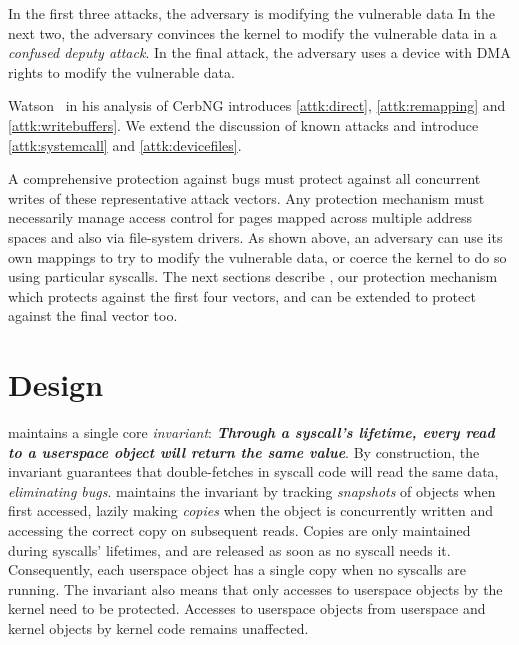 \documentclass[letterpaper,twocolumn,10pt, anonymous]{article}
\begin{document}
In the first three attacks, the adversary is modifying the vulnerable data 
In the next two, the adversary convinces the kernel to modify the vulnerable
data in a \emph{confused deputy attack}.
In the final attack, the adversary uses a device with DMA rights to modify 
the vulnerable data.

Watson~\cite{watson2007exploiting} in his analysis of CerbNG introduces
\autoref{attk:direct}, \autoref{attk:remapping} and \autoref{attk:writebuffers}.
We extend the discussion of known attacks and introduce
\autoref{attk:systemcall} and \autoref{attk:devicefiles}.

A comprehensive protection against \tocttou bugs must protect against 
all concurrent writes of these representative attack vectors.
Any protection mechanism must necessarily manage access control for pages
mapped across multiple address spaces and also via file-system drivers.
As shown above, an adversary can use its own mappings to try to modify the
vulnerable data, or coerce the kernel to do so using particular syscalls.
The next sections describe \tiktok, our protection mechanism which 
protects against the first four vectors, and can be extended to protect 
against the final vector too.


\section{\tiktok Design} 
\label{sec:design}

\tiktok maintains a single core \emph{invariant}:
\textbf{\emph{Through a syscall's lifetime, every read to a userspace object 
will return the same value}}.
By construction, the invariant guarantees that double-fetches in syscall
code will read the same data, \emph{eliminating \tocttou bugs}.
\tiktok maintains the invariant by tracking \emph{snapshots} of objects
when first accessed, lazily making \emph{copies} when the object is concurrently 
written and accessing the correct copy on subsequent reads.
Copies are only maintained during syscalls' lifetimes, and are released as 
soon as no syscall needs it.
Consequently, each userspace object has a single copy when no syscalls are
running.
The invariant also means that only accesses to userspace objects by the kernel
need to be protected. 
Accesses to userspace objects from userspace and kernel objects by kernel 
code remains unaffected.
\end{document}
